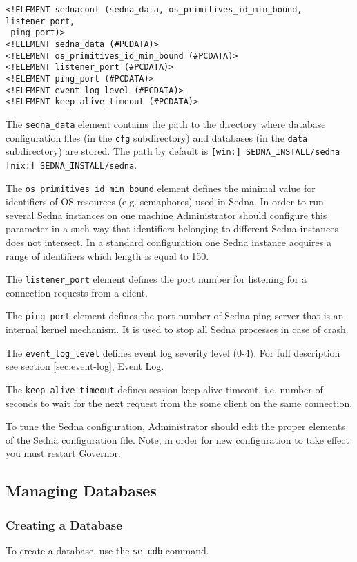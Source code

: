 \documentclass[a4paper,12pt]{article}
\begin{document}
\begin{verbatim}
<!ELEMENT sednaconf (sedna_data, os_primitives_id_min_bound, listener_port,
 ping_port)>
<!ELEMENT sedna_data (#PCDATA)>
<!ELEMENT os_primitives_id_min_bound (#PCDATA)>
<!ELEMENT listener_port (#PCDATA)>
<!ELEMENT ping_port (#PCDATA)>
<!ELEMENT event_log_level (#PCDATA)>
<!ELEMENT keep_alive_timeout (#PCDATA)>
\end{verbatim}

The \verb!sedna_data! element contains the path to the directory where
database configuration files (in the \verb!cfg! subdirectory) and
databases (in the \verb!data! subdirectory) are stored. The path by default is
\verb![win:] SEDNA_INSTALL/sedna! \verb![nix:] SEDNA_INSTALL/sedna!.

The \verb!os_primitives_id_min_bound! element defines the minimal value for identifiers of OS resources (e.g. semaphores) used in Sedna. In order to run several Sedna instances on one machine Administrator should configure this parameter in a such way that identifiers belonging to different Sedna instances does not intersect. In a standard configuration one Sedna instance acquires a range of identifiers which length is equal to 150.

The \verb!listener_port! element defines the port number for listening for a connection requests from a client.

The \verb!ping_port! element defines the port number of Sedna ping server that is an internal kernel mechanism. It is used to stop all Sedna processes in case of crash.

The \verb!event_log_level! defines event log severity level (0-4). For full description see section \ref{sec:event-log}, Event Log.

The \verb!keep_alive_timeout! defines session keep alive timeout, i.e. number of seconds to wait for the next request from the some client on the same connection.

To tune the Sedna configuration, Administrator should edit the proper elements of the Sedna configuration file. Note, in order for new configuration to take effect you must restart Governor.

\subsection{Managing Databases}
\subsubsection{Creating a Database}
\label{CreateDB}
To create a database, use the \verb!se_cdb! command.
\end{document}
